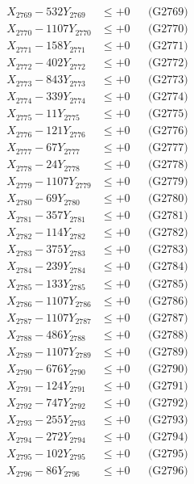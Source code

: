 \documentclass[a4paper,10pt]{article}
\begin{document}
{\begin{align}
X_{2769} - 532Y_{2769} &\leq +0 && \text{(G2769)} \\
X_{2770} - 1107Y_{2770} &\leq +0 && \text{(G2770)} \\
\allowbreak
X_{2771} - 158Y_{2771} &\leq +0 && \text{(G2771)} \\
X_{2772} - 402Y_{2772} &\leq +0 && \text{(G2772)} \\
X_{2773} - 843Y_{2773} &\leq +0 && \text{(G2773)} \\
X_{2774} - 339Y_{2774} &\leq +0 && \text{(G2774)} \\
X_{2775} - 11Y_{2775} &\leq +0 && \text{(G2775)} \\
X_{2776} - 121Y_{2776} &\leq +0 && \text{(G2776)} \\
X_{2777} - 67Y_{2777} &\leq +0 && \text{(G2777)} \\
X_{2778} - 24Y_{2778} &\leq +0 && \text{(G2778)} \\
X_{2779} - 1107Y_{2779} &\leq +0 && \text{(G2779)} \\
X_{2780} - 69Y_{2780} &\leq +0 && \text{(G2780)} \\
\allowbreak
X_{2781} - 357Y_{2781} &\leq +0 && \text{(G2781)} \\
X_{2782} - 114Y_{2782} &\leq +0 && \text{(G2782)} \\
X_{2783} - 375Y_{2783} &\leq +0 && \text{(G2783)} \\
X_{2784} - 239Y_{2784} &\leq +0 && \text{(G2784)} \\
X_{2785} - 133Y_{2785} &\leq +0 && \text{(G2785)} \\
X_{2786} - 1107Y_{2786} &\leq +0 && \text{(G2786)} \\
X_{2787} - 1107Y_{2787} &\leq +0 && \text{(G2787)} \\
X_{2788} - 486Y_{2788} &\leq +0 && \text{(G2788)} \\
X_{2789} - 1107Y_{2789} &\leq +0 && \text{(G2789)} \\
X_{2790} - 676Y_{2790} &\leq +0 && \text{(G2790)} \\
\allowbreak
X_{2791} - 124Y_{2791} &\leq +0 && \text{(G2791)} \\
X_{2792} - 747Y_{2792} &\leq +0 && \text{(G2792)} \\
X_{2793} - 255Y_{2793} &\leq +0 && \text{(G2793)} \\
X_{2794} - 272Y_{2794} &\leq +0 && \text{(G2794)} \\
X_{2795} - 102Y_{2795} &\leq +0 && \text{(G2795)} \\
X_{2796} - 86Y_{2796} &\leq +0 && \text{(G2796)} \\

\end{align}}
\end{document}
